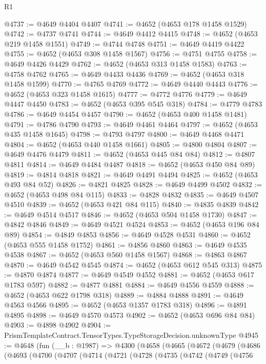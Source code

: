 \begin{lexlean}{R1}
\begin{coremodule}
@4737 := @4649 @4404 @4407
@4741 := @4652 (@4653 @178 @1458 @1529)
@4742 := @4737 @4741
@4744 := @4649 @4412 @4415
@4748 := @4652 (@4653 @219 @1458 @1551)
@4749 := @4744 @4748
@4751 := @4649 @4419 @4422
@4755 := @4652 (@4653 @308 @1458 @1567)
@4756 := @4751 @4755
@4758 := @4649 @4426 @4429
@4762 := @4652 (@4653 @313 @1458 @1583)
@4763 := @4758 @4762
@4765 := @4649 @4433 @4436
@4769 := @4652 (@4653 @318 @1458 @1599)
@4770 := @4765 @4769
@4772 := @4649 @4440 @4443
@4776 := @4652 (@4653 @323 @1458 @1615)
@4777 := @4772 @4776
@4779 := @4649 @4447 @4450
@4783 := @4652 (@4653 @395 @545 @318)
@4784 := @4779 @4783
@4786 := @4649 @4454 @4457
@4790 := @4652 (@4653 @400 @1458 @1481)
@4791 := @4786 @4790
@4793 := @4649 @4461 @4464
@4797 := @4652 (@4653 @435 @1458 @1645)
@4798 := @4793 @4797
@4800 := @4649 @4468 @4471
@4804 := @4652 (@4653 @440 @1458 @1661)
@4805 := @4800 @4804
@4807 := @4649 @4476 @4479
@4811 := @4652 (@4653 @445 @84 @84)
@4812 := @4807 @4811
@4814 := @4649 @4484 @4487
@4818 := @4652 (@4653 @450 @84 @89)
@4819 := @4814 @4818
@4821 := @4649 @4491 @4494
@4825 := @4652 (@4653 @493 @84 @52)
@4826 := @4821 @4825
@4828 := @4649 @4499 @4502
@4832 := @4652 (@4653 @498 @84 @115)
@4833 := @4828 @4832
@4835 := @4649 @4507 @4510
@4839 := @4652 (@4653 @421 @84 @115)
@4840 := @4835 @4839
@4842 := @4649 @4514 @4517
@4846 := @4652 (@4653 @504 @1458 @1730)
@4847 := @4842 @4846
@4849 := @4649 @4521 @4524
@4853 := @4652 (@4653 @196 @84 @89)
@4854 := @4849 @4853
@4856 := @4649 @4528 @4531
@4860 := @4652 (@4653 @555 @1458 @1752)
@4861 := @4856 @4860
@4863 := @4649 @4535 @4538
@4867 := @4652 (@4653 @560 @1458 @1567)
@4868 := @4863 @4867
@4870 := @4649 @4542 @4545
@4874 := @4652 (@4653 @612 @545 @313)
@4875 := @4870 @4874
@4877 := @4649 @4549 @4552
@4881 := @4652 (@4653 @617 @1783 @597)
@4882 := @4877 @4881
@4884 := @4649 @4556 @4559
@4888 := @4652 (@4653 @622 @1798 @318)
@4889 := @4884 @4888
@4891 := @4649 @4563 @4566
@4895 := @4652 (@4653 @1357 @1783 @318)
@4896 := @4891 @4895
@4898 := @4649 @4570 @4573
@4902 := @4652 (@4653 @696 @84 @84)
@4903 := @4898 @4902
@4904 := PrismTemplateContract.TensorTypes.TypeStorageDecision.unknownType
@4945 := @4648
    (fun (__b : @1987) =>
    @4300
      (@4658
        (@4665
          (@4672
            (@4679
              (@4686
                (@4693
                  (@4700
                    (@4707
                      (@4714
                        (@4721
                          (@4728
                            (@4735
                              (@4742
                                (@4749
                                  (@4756

\end{coremodule}
\end{lexlean}
